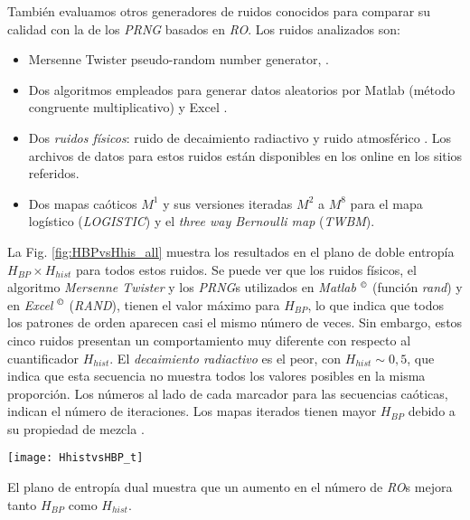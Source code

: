 También evaluamos otros generadores de ruidos conocidos para comparar su calidad con la de los \emph{PRNG} basados en \emph{RO}.
Los ruidos analizados son:

\begin{itemize}
  \item Mersenne Twister pseudo-random number generator, \cite{Matsumoto1998}.
  \item Dos algoritmos empleados para generar datos aleatorios por Matlab (método congruente multiplicativo) \cite{Matlab} y Excel \cite{McLeod1985}.
  \item Dos \emph{ruidos físicos}: ruido de decaimiento radiactivo \cite{Walker2001} y ruido atmosférico \cite{Haahr}.
  Los archivos de datos para estos ruidos están disponibles en los online en los sitios referidos.
  \item Dos mapas caóticos $M^1$ y sus versiones iteradas $M^2$ a $M^8$ \cite{DeMicco2008} para el mapa logístico (\emph{LOGISTIC}) y el \emph{three way Bernoulli map} (\emph{TWBM}).
\end{itemize}

La Fig. \ref{fig:HBPvsHhis_all} muestra los resultados en el plano de doble entropía $H_ {BP} \times H_{hist}$ para todos estos ruidos.
Se puede ver que los ruidos físicos, el algoritmo \emph{Mersenne Twister} y los \emph{PRNG}s utilizados en \emph{Matlab} $^\copyright$ (función \emph{rand}) y en \emph{Excel} $^\copyright$ (\emph{RAND}), tienen el valor máximo para $H_{BP}$, lo que indica que todos los patrones de orden aparecen casi el mismo número de veces.
Sin embargo, estos cinco ruidos presentan un comportamiento muy diferente con respecto al cuantificador $H_{hist}$.
El \emph{decaimiento radiactivo} es el peor, con $H_ {hist} \sim 0,5$, que indica que esta secuencia no muestra todos los valores posibles en la misma proporción.
Los números al lado de cada marcador para las secuencias caóticas, indican el número de iteraciones.
Los mapas iterados tienen mayor $H_{BP}$ debido a su propiedad de mezcla \cite{DeMicco2008}.
%
\begin{figure*}
\begin{center}
\texttt{[image: HhistvsHBP\_t]}
\caption{Plano $H_{hist} \times H_{BP}$ para distintos RNGs. Los números que siguen a cada cuadrado indica la cantidad de \emph{RO}s utilizado en cada \emph{TRNG}.
Los números al lado de cada punto en las secuencias caóticas \emph{Logistic} y \emph{TWBM} indican el número de iteración para el mapa caótico (ver texto).}
\label{fig:HBPvsHhis_all}
\end{center}
\end{figure*}
%
El plano de entropía dual muestra que un aumento en el número de \emph{RO}s mejora tanto $H_ {BP}$ como $H_ {hist}$.

